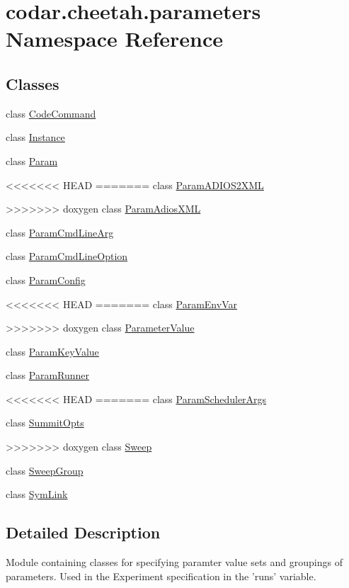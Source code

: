 \hypertarget{namespacecodar_1_1cheetah_1_1parameters}{}\section{codar.\+cheetah.\+parameters Namespace Reference}
\label{namespacecodar_1_1cheetah_1_1parameters}
\subsection*{Classes}
\begin{DoxyCompactItemize}
\item 
class \hyperlink{classcodar_1_1cheetah_1_1parameters_1_1_code_command}{Code\+Command}
\item 
class \hyperlink{classcodar_1_1cheetah_1_1parameters_1_1_instance}{Instance}
\item 
class \hyperlink{classcodar_1_1cheetah_1_1parameters_1_1_param}{Param}
\item 
<<<<<<< HEAD
=======
class \hyperlink{classcodar_1_1cheetah_1_1parameters_1_1_param_a_d_i_o_s2_x_m_l}{Param\+A\+D\+I\+O\+S2\+X\+ML}
\item 
>>>>>>> doxygen
class \hyperlink{classcodar_1_1cheetah_1_1parameters_1_1_param_adios_x_m_l}{Param\+Adios\+X\+ML}
\item 
class \hyperlink{classcodar_1_1cheetah_1_1parameters_1_1_param_cmd_line_arg}{Param\+Cmd\+Line\+Arg}
\item 
class \hyperlink{classcodar_1_1cheetah_1_1parameters_1_1_param_cmd_line_option}{Param\+Cmd\+Line\+Option}
\item 
class \hyperlink{classcodar_1_1cheetah_1_1parameters_1_1_param_config}{Param\+Config}
\item 
<<<<<<< HEAD
=======
class \hyperlink{classcodar_1_1cheetah_1_1parameters_1_1_param_env_var}{Param\+Env\+Var}
\item 
>>>>>>> doxygen
class \hyperlink{classcodar_1_1cheetah_1_1parameters_1_1_parameter_value}{Parameter\+Value}
\item 
class \hyperlink{classcodar_1_1cheetah_1_1parameters_1_1_param_key_value}{Param\+Key\+Value}
\item 
class \hyperlink{classcodar_1_1cheetah_1_1parameters_1_1_param_runner}{Param\+Runner}
\item 
<<<<<<< HEAD
=======
class \hyperlink{classcodar_1_1cheetah_1_1parameters_1_1_param_scheduler_args}{Param\+Scheduler\+Args}
\item 
class \hyperlink{classcodar_1_1cheetah_1_1parameters_1_1_summit_opts}{Summit\+Opts}
\item 
>>>>>>> doxygen
class \hyperlink{classcodar_1_1cheetah_1_1parameters_1_1_sweep}{Sweep}
\item 
class \hyperlink{classcodar_1_1cheetah_1_1parameters_1_1_sweep_group}{Sweep\+Group}
\item 
class \hyperlink{classcodar_1_1cheetah_1_1parameters_1_1_sym_link}{Sym\+Link}
\end{DoxyCompactItemize}


\subsection{Detailed Description}
\begin{DoxyVerb}Module containing classes for specifying paramter value sets and groupings
of parameters. Used in the Experiment specification in the 'runs' variable.
\end{DoxyVerb}
 